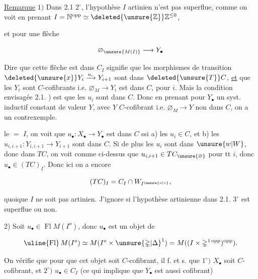 \uline{Remarque} $1)$ Dans 2.1 $2^\circ$, l'hypothèse $I$ artinien n'est pas superflue, comme on voit en prenant $I=\mathbb N^{\mathrm{opp}}\simeq\deleted{\unsure{\mathbb Z}}\mathbb Z^{\le0}$,



et pour une flèche

\[
 \varnothing_{\unsure{M(I)}}\longrightarrow Y_\bullet
\]

Dire que cette flèche est dans $C_I$ signifie que les morphismes de transition $\deleted{\unsure{x}}Y_i\xrightarrow{u_i}Y_{i+1}$ sont dans $\deleted{\unsure{T}}C$, \uline{et} que les $Y_i$ sont $C$-cofibrants i.e. $\varnothing_M\longrightarrow Y_i$ est dans $C$, pour  $i$. Mais la condition envisagée  2.1. ) est  que les $u_i$ sont dans $C$. Donc en prenant pour $Y_\bullet$ un syst. inductif constant de valeur $Y$, avec $Y$  $C$-cofibrant i.e. $\varnothing_M\longrightarrow Y$ non dans $C$, on a un contrexemple.

 le $=$ $I$, on voit que $u_\bullet:X_\bullet\longrightarrow Y_\bullet$ est dans $C$ ssi a) les $u_i\in C$, et b) les $u_{i,i+1}:Y_{i,i+1}\longrightarrow Y_{i+1}$ sont dans $C$. Si de plus les $u_i$ sont dans $\unsure{w|W}$, donc dans $TC$, on voit comme ci-dessus que $u_{i,i+1}\in TC_{\unsure{\varnothing}}$ pour tt $i$, donc $u_\bullet\in(TC)_I$. Donc ici on a encore

\[
 (TC)_I=C_I\cap W_{I^{\unsure{o|\circ}}},
\]

quoique $I$ ne soit pas artinien. J'ignore si l'hypothèse artinienne dans 2.1. $3^\circ$ est superflue ou non.

2) Soit $u_\bullet\in\operatorname{Fl}M(I^o)$, donc $u_\bullet$ est un objet de

\[
 \text{\uline{Fl}}\,M(I^o)\simeq M(I^o\times\unsure{\mathbb{\Delta}|\Delta}^{1})=M((I\times\mathbb{\Delta}^{1\,\mathrm{opp}})^{\mathrm{opp}}).
\]

 On vérifie que pour que cet objet soit $C$-cofibrant, il f. et s. que $1^\circ)$ $X_\bullet$ soit $C$-cofibrant, et $2^\circ)$ $u_\bullet\in C_I$ (ce qui implique que $Y_\bullet$ est aussi cofibrant)



